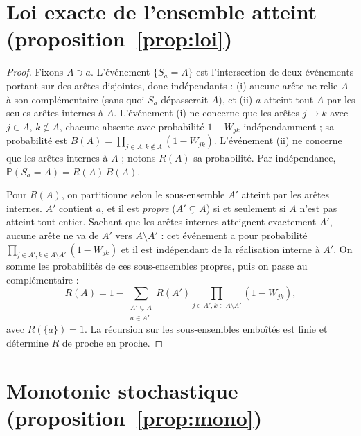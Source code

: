 \section*{Loi exacte de l'ensemble atteint (proposition~\ref{prop:loi})}

\begin{proof}
Fixons $A\ni a$. L'événement $\{S_a=A\}$ est l'intersection de deux événements portant sur des
arêtes disjointes, donc indépendants : (i) aucune arête ne relie $A$ à son complémentaire (sans
quoi $S_a$ dépasserait $A$), et (ii) $a$ atteint tout $A$ par les seules arêtes internes à $A$.
L'événement (i) ne concerne que les arêtes $j\to k$ avec $j\in A$, $k\notin A$, chacune absente
avec probabilité $1-W_{jk}$ indépendamment ; sa probabilité est $B(A)=\prod_{j\in A,k\notin A}(1-W_{jk})$.
L'événement (ii) ne concerne que les arêtes internes à $A$ ; notons $R(A)$ sa probabilité.
Par indépendance, $\mathbb P(S_a=A)=R(A)\,B(A)$.

Pour $R(A)$, on partitionne selon le sous-ensemble $A'$ atteint par les arêtes internes. $A'$
contient $a$, et il est \emph{propre} ($A'\subsetneq A$) si et seulement si $A$ n'est pas atteint
tout entier. Sachant que les arêtes internes atteignent exactement $A'$, aucune arête ne va de $A'$
vers $A\setminus A'$ : cet événement a pour probabilité
$\prod_{j\in A',k\in A\setminus A'}(1-W_{jk})$ et il est indépendant de la réalisation interne à
$A'$. On somme les probabilités de ces sous-ensembles propres, puis on passe au complémentaire :
\[
  R(A)=1-\sum_{\substack{A'\subsetneq A\\ a\in A'}} R(A')\!\!\prod_{j\in A',k\in A\setminus A'}\!\!(1-W_{jk}),
\]
avec $R(\{a\})=1$. La récursion sur les sous-ensembles emboîtés est finie et détermine $R$ de
proche en proche.
\end{proof}

\section*{Monotonie stochastique (proposition~\ref{prop:mono})}

